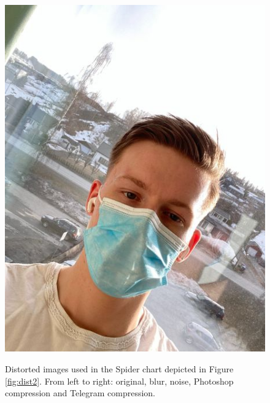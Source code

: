 \begin{figure}[H]
    \subfloat
        {\includegraphics[scale = 0.13]{figures/0718.jpg}}
    \caption{Distorted images used in the Spider chart depicted in Figure \ref{fig:dist2}. From left to right: original, blur, noise, Photoshop compression and Telegram compression.}
    \label{fig:Distorted2}
\end{figure}


